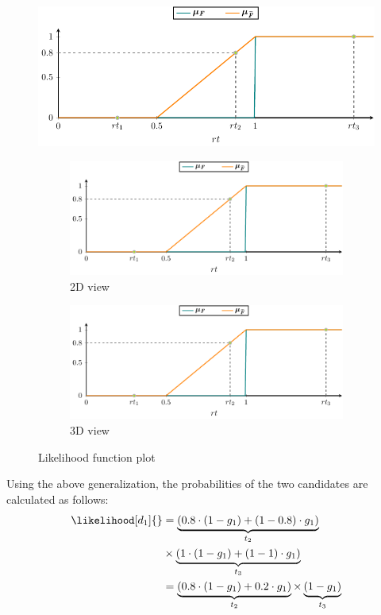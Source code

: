 \begin{figure}[ht]
  \includegraphics[page=4]{figures/fuzzinel/figures/main.pdf}
  \\
  \begin{subfigure}{0.48\columnwidth}
    \includegraphics[page=5]{figures/fuzzinel/figures/main.pdf}
    \caption{2D view}
  \end{subfigure}
  \hfill{}
  \begin{subfigure}{0.48\columnwidth}
    \includegraphics[page=6]{figures/fuzzinel/figures/main.pdf}
    \caption{3D view}
  \end{subfigure}
  \caption{Likelihood function plot\label{fig:fuzzinel:likelihood-generalization}}
\end{figure}



Using the above generalization, the probabilities of the two
candidates are calculated as follows:
\begin{equation}
  \begin{split} \likelihood[d_1]{} &= \underbrace{(0.8 \cdot (1-g_1) +
      (1 - 0.8) \cdot g_1)}_{t_2} \\ &\times \underbrace{(1 \cdot (1-g_1) +
      (1 - 1) \cdot g_1)}_{t_3}\\
    &= \underbrace{(0.8 \cdot (1 - g_1) + 0.2 \cdot g_1)}_{t_2} \times \underbrace{(1 - g_1)}_{t_3}
  \end{split}
\end{equation}

